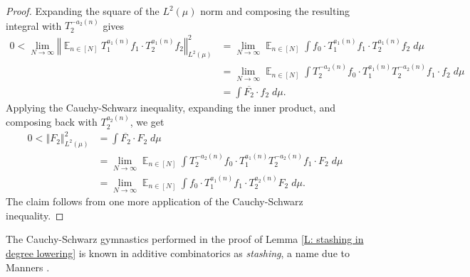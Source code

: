 \documentclass[11pt]{amsart}
\theoremstyle{definition}
\DeclareMathOperator*{\E}{\mathbb{E}}
\newcommand{\Id}{\textrm{Id}}
\newcommand{\norm}[1]{\left\Vert #1\right\Vert}
\newcommand{\1}{{\mathbf{1}}}
\begin{document}
\begin{proof}
    Expanding the square of the $L^2(\mu)$ norm and composing the resulting integral with $T_{2}^{-a_{2}(n)}$ gives
    \begin{align*}
        0< \lim_{N\to\infty}\norm{\E_{n\in[N]}T_1^{a_1(n)}f_1 \cdot T_2^{a_1(n)}f_2}_{L^2(\mu)}^2 &= \lim_{N\to\infty} \E_{n\in[N]} \int f_0\cdot T_1^{a_1(n)}f_1 \cdot T_2^{a_1(n)}f_2\; d\mu\\
        &=\lim_{N\to\infty} \E_{n\in[N]} \int T_2^{-a_2(n)}{f_0}\cdot T_1^{a_1(n)}T_2^{-a_2(n)}{f_1}\cdot f_2\; d\mu\\ 
        &= \int \overline{F_2}\cdot f_2\; d\mu.
    \end{align*}
    Applying the Cauchy-Schwarz inequality, expanding the inner product, and composing back with $T_{2}^{a_{2}(n)}$, we get
    \begin{align*}
        0< \norm{F_2}_{L^2(\mu)}^2 &= \int  \overline{F_2}\cdot F_2 \; d\mu\\
        &=\lim_{N\to\infty} \E_{n\in[N]} \int T_2^{-a_2(n)}{f_0}\cdot T_1^{a_1(n)}T_2^{-a_2(n)}{f_1}\cdot F_2\; d\mu\\
        &= \lim_{N\to\infty} \E_{n\in[N]} \int f_0\cdot T_1^{a_1(n)}{f_1}\cdot T_{2}^{a_{2}(n)}F_2\; d\mu.
    \end{align*}
    The claim follows from one more application of the Cauchy-Schwarz inequality.
\end{proof}
The Cauchy-Schwarz gymnastics performed in the proof of Lemma \ref{L: stashing in degree lowering} is known in additive combinatorics as \emph{stashing}, a name due to Manners \cite{Man21}.
\end{document}
